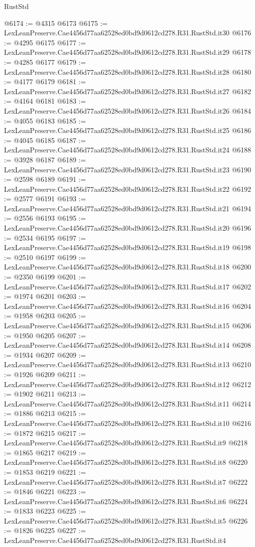 \begin{lexlean}{RustStd}
\begin{coremodule}
@6174 := @4315 @6173
@6175 := LexLeanPreserve.Cae4456d77aa62528ed0bd9d0612cd278.R31.RustStd.it30
@6176 := @4295 @6175
@6177 := LexLeanPreserve.Cae4456d77aa62528ed0bd9d0612cd278.R31.RustStd.it29
@6178 := @4285 @6177
@6179 := LexLeanPreserve.Cae4456d77aa62528ed0bd9d0612cd278.R31.RustStd.it28
@6180 := @4177 @6179
@6181 := LexLeanPreserve.Cae4456d77aa62528ed0bd9d0612cd278.R31.RustStd.it27
@6182 := @4164 @6181
@6183 := LexLeanPreserve.Cae4456d77aa62528ed0bd9d0612cd278.R31.RustStd.it26
@6184 := @4055 @6183
@6185 := LexLeanPreserve.Cae4456d77aa62528ed0bd9d0612cd278.R31.RustStd.it25
@6186 := @4045 @6185
@6187 := LexLeanPreserve.Cae4456d77aa62528ed0bd9d0612cd278.R31.RustStd.it24
@6188 := @3928 @6187
@6189 := LexLeanPreserve.Cae4456d77aa62528ed0bd9d0612cd278.R31.RustStd.it23
@6190 := @2598 @6189
@6191 := LexLeanPreserve.Cae4456d77aa62528ed0bd9d0612cd278.R31.RustStd.it22
@6192 := @2577 @6191
@6193 := LexLeanPreserve.Cae4456d77aa62528ed0bd9d0612cd278.R31.RustStd.it21
@6194 := @2556 @6193
@6195 := LexLeanPreserve.Cae4456d77aa62528ed0bd9d0612cd278.R31.RustStd.it20
@6196 := @2534 @6195
@6197 := LexLeanPreserve.Cae4456d77aa62528ed0bd9d0612cd278.R31.RustStd.it19
@6198 := @2510 @6197
@6199 := LexLeanPreserve.Cae4456d77aa62528ed0bd9d0612cd278.R31.RustStd.it18
@6200 := @2350 @6199
@6201 := LexLeanPreserve.Cae4456d77aa62528ed0bd9d0612cd278.R31.RustStd.it17
@6202 := @1974 @6201
@6203 := LexLeanPreserve.Cae4456d77aa62528ed0bd9d0612cd278.R31.RustStd.it16
@6204 := @1958 @6203
@6205 := LexLeanPreserve.Cae4456d77aa62528ed0bd9d0612cd278.R31.RustStd.it15
@6206 := @1950 @6205
@6207 := LexLeanPreserve.Cae4456d77aa62528ed0bd9d0612cd278.R31.RustStd.it14
@6208 := @1934 @6207
@6209 := LexLeanPreserve.Cae4456d77aa62528ed0bd9d0612cd278.R31.RustStd.it13
@6210 := @1926 @6209
@6211 := LexLeanPreserve.Cae4456d77aa62528ed0bd9d0612cd278.R31.RustStd.it12
@6212 := @1902 @6211
@6213 := LexLeanPreserve.Cae4456d77aa62528ed0bd9d0612cd278.R31.RustStd.it11
@6214 := @1886 @6213
@6215 := LexLeanPreserve.Cae4456d77aa62528ed0bd9d0612cd278.R31.RustStd.it10
@6216 := @1872 @6215
@6217 := LexLeanPreserve.Cae4456d77aa62528ed0bd9d0612cd278.R31.RustStd.it9
@6218 := @1865 @6217
@6219 := LexLeanPreserve.Cae4456d77aa62528ed0bd9d0612cd278.R31.RustStd.it8
@6220 := @1853 @6219
@6221 := LexLeanPreserve.Cae4456d77aa62528ed0bd9d0612cd278.R31.RustStd.it7
@6222 := @1846 @6221
@6223 := LexLeanPreserve.Cae4456d77aa62528ed0bd9d0612cd278.R31.RustStd.it6
@6224 := @1833 @6223
@6225 := LexLeanPreserve.Cae4456d77aa62528ed0bd9d0612cd278.R31.RustStd.it5
@6226 := @1826 @6225
@6227 := LexLeanPreserve.Cae4456d77aa62528ed0bd9d0612cd278.R31.RustStd.it4

\end{coremodule}
\end{lexlean}
